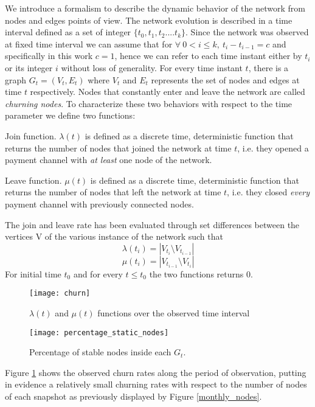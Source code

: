 	
	We introduce a formalism to describe the dynamic behavior of the network from nodes and edges points of view. The network evolution is described in a time interval defined as a set of integer $\{t_0, t_1, t_2 .... t_k \}$. Since the network was observed at fixed time interval  we can assume that for $\forall \: 0 < i \leq k,\: t_i-t_{i-1} = c$ and specifically in this work $c = 1$, hence we can refer to each time instant either by $t_i$ or its integer $i$ without loss of generality. For every time instant $t$, there is a graph $G_{t}= (V_t,E_t)$ where $V_t$ and $E_t$ represents the set of nodes and edges at time $t$ respectively. Nodes that constantly enter and leave the network are called \textit{churning nodes}. To characterize these two behaviors with respect to the time parameter we define two functions:
	\begin{definition}
		Join function. $\lambda(t)$ is defined as a discrete time, deterministic function that returns the number of nodes that joined the network at time $t$, i.e. they opened a payment channel with \textit{at least} one node of the network.
	\end{definition}
	\begin{definition}
		Leave function. $\mu(t)$ is defined as a discrete time, deterministic function that returns the number of nodes that left the network at time $t$, i.e. they closed \textit{every} payment channel with previously connected nodes.
	\end{definition}
	The join and leave rate has been evaluated through set differences between the vertices V of the various instance of the network such that
	$$\lambda(t_i) = |V_{t_i} \setminus V_{t_{i-1}}|$$
	$$\mu(t_i) = |V_{t_{i-1}} \setminus V_{t_i}| $$
	For initial time $t_0$ and for every $t \leq t_0$ the two functions returns 0.
	\begin{figure}[h]
		\texttt{[image: churn]}
		\caption{$\lambda(t)$ and $\mu(t)$ functions over the observed time interval}
		\label{churn}
	\end{figure}
	\begin{figure}
		\texttt{[image: percentage\_static\_nodes]}
		\caption{Percentage of stable nodes inside each $G_t$.}
		\label{percentage_static_nodes}
	\end{figure}
	Figure \ref{churn} shows the observed churn rates along the period of observation, putting in evidence a relatively small churning rates with respect to the number of nodes of each snapshot as previously displayed by Figure \ref{monthly_nodes}.
	
